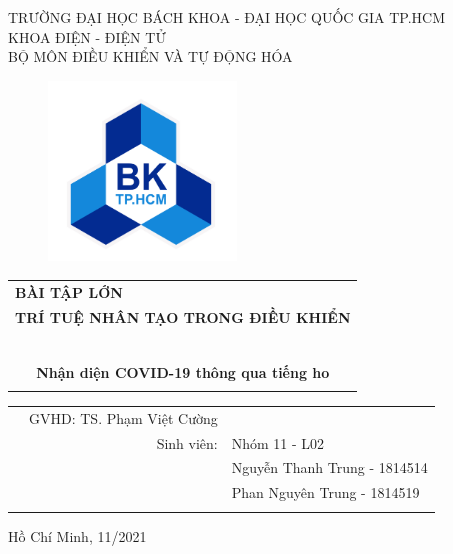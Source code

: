 \documentclass[a4paper, 12pt]{article}
\begin{document}
\begin{titlepage}

\begin{center}
TRƯỜNG ĐẠI HỌC BÁCH KHOA - ĐẠI HỌC QUỐC GIA TP.HCM\\
KHOA ĐIỆN - ĐIỆN TỬ\\
BỘ MÔN ĐIỀU KHIỂN VÀ TỰ ĐỘNG HÓA
\end{center}

\vspace{1cm}

\begin{figure}[!h]
\begin{center}
\includegraphics[width=5cm]{hcmut.png}
\end{center}
\end{figure}



\begin{center}
\begin{tabular}{c}
\multicolumn{1}{l}{\textbf{{\large BÀI TẬP LỚN}}}\\
\multicolumn{1}{l}{\textbf{{\large TRÍ TUỆ NHÂN TẠO TRONG ĐIỀU KHIỂN}}}\\
~~\\
\hline
\\
\textbf{\LARGE Nhận diện COVID-19 thông qua tiếng ho}\\
\\
\hline
\end{tabular}
\end{center}

\vspace{3cm}

\begin{table}[h]
\begin{tabular}{rrl}

\hspace{2cm} & GVHD: TS. Phạm Việt Cường \\
& Sinh viên: & Nhóm 11 - L02\\
& & Nguyễn Thanh Trung - 1814514\\
& & Phan Nguyên Trung - 1814519\\
\vspace{30pt}\\

\end{tabular}
\end{table}

\begin{center}
{\footnotesize Hồ Chí Minh, 11/2021}
\end{center}
\end{titlepage}
\end{document}
